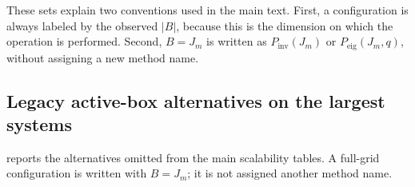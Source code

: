 \begin{table}[H]
\centering
\scriptsize
\setlength{\tabcolsep}{3pt}
\caption{Candidate score budgets, resulting box sizes, and EigenPro ranks in
the saved experiment bundle. Entries in braces are aligned by position.}
\label{tab:candidate-configurations}
\end{table}

These sets explain two conventions used in the main text. First, a
configuration is always labeled by the observed \(|B|\), because this is the
dimension on which the operation is performed. Second, \(B=J_m\) is written as
\(P_{\mathrm{inv}}(J_m)\) or \(P_{\mathrm{eig}}(J_m,q)\), without assigning a
new method name.

\subsection{Legacy active-box alternatives on the largest systems}

 reports the alternatives omitted
from the main scalability tables. A full-grid configuration is written with
\(B=J_m\); it is not assigned another method name.

